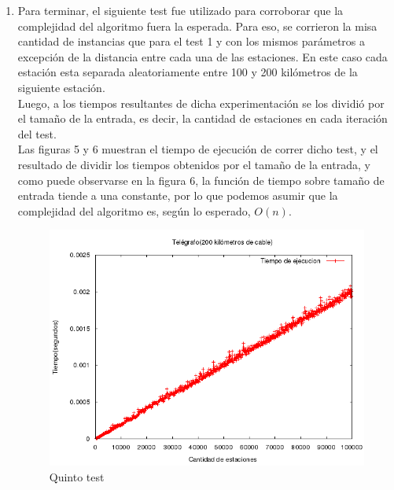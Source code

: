 \documentclass[10pt, a4paper]{article}
\begin{document}
\begin{enumerate}
	\item Para terminar, el siguiente test fue utilizado para corroborar que la complejidad del algoritmo fuera la esperada. Para eso, se corrieron la misa cantidad de instancias que para el test 1 y con los mismos par\'ametros a excepci\'on de la distancia entre cada una de las estaciones. En este caso cada estaci\'on esta separada aleatoriamente entre 100 y 200 kil\'ometros de la siguiente estaci\'on.\\
	Luego, a los tiempos resultantes de dicha experimentaci\'on se los dividió por el tama\~no de la entrada, es decir, la cantidad de estaciones en cada iteraci\'on del test. \\
	Las figuras 5 y 6 muestran el tiempo de ejecuci\'on de correr dicho test, y el resultado de dividir los tiempos obtenidos por el tama\~no de la entrada, y como puede observarse en la figura 6, la funci\'on de tiempo sobre tama\~no de entrada tiende a una constante, por lo que podemos asumir que la complejidad del algoritmo es, seg\'un lo esperado, $O(n)$.\\
	\begin{figure}[H]
  		\centering
   	 	\includegraphics[width=1\textwidth]
   	 	{Imagenes/telegrafoTiempos4.png}
		\caption{Quinto test}
	\end{figure}
	

\end{enumerate}
\end{document}
